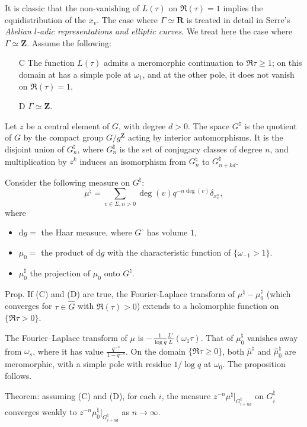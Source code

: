 \documentclass{article}
\newcommand{\bR}{\mathbf{R}}
\newcommand{\bZ}{\mathbf{Z}}
\newcommand{\dd}{\mathrm{d}}
\begin{document}
It is classic that the non-vanishing of $L(\tau)$ on $\Re(\tau)=1$ implies the 
equidistribution of the $x_v$. The case where $\Gamma\simeq \bR$ is treated in 
detail in Serre's \emph{Abelian $l$-adic representations and elliptic curves}. 
We treat here the case where $\Gamma\simeq \bZ$. Assume the following:
\begin{itemize}
\item[C] The function $L(\tau)$ admits a meromorphic continuation to 
$\Re\tau\geqslant 1$; on this domain at has a simple pole at $\omega_1$, and at 
the other pole, it does not vanish on $\Re(\tau)=1$.
\item[D] $\Gamma\simeq\bZ$. 
\end{itemize}

Let $z$ be a central element of $G$, with degree $d>0$. The space $G^\natural$ 
is the quotient of $G$ by the compact group $G/g^\bZ$ acting by interior 
automorphisms. It is the disjoint union of $G_n^\natural$, where $G_n^\natural$ 
is the set of conjugacy classes of degree $n$, and multiplication by $z^k$ 
induces an isomorphism from $G_n^\natural$ to $G_{n+k d}^\natural$. 

Consider the following measure on $G^\natural$:
\[
	\mu^\natural = \sum_{v\in\Sigma,n>0} \deg(v) q^{-n\deg(v)} \delta_{x_v^n} ,
\]
where 
\begin{itemize}
\item $\dd g=$ the Haar measure, where $G^\circ$ has volume $1$,
\item $\mu_0=$ the product of $\dd g$ with the characteristic function of 
$\{\omega_{-1}>1\}$. 
\item $\mu_0^\natural$ the projection of $\mu_0$ onto $G^\natural$.
\end{itemize}

Prop. If (C) and (D) are true, the Fourier-Laplace transform of 
$\mu^\natural-\mu_0^\natural$ (which converges for $\tau\in \widehat G$ with 
$\Re(\tau)>0$) extends to a holomorphic function on $\{\Re\tau>0\}$. 

The Fourier--Laplace transform of $\mu$ is 
$-\frac{1}{\log q} \frac{L'}{L}(\omega_1\tau)$. That of $\mu_0^\natural$ 
vanishes away from $\omega_s$, where it has value 
$\frac{q^{-s}}{1-q^{-s}}$. On the domain $\{\Re \tau\geqslant 0\}$, 
both $\widehat\mu^\natural$ and $\widehat \mu_0^\natural$ are meromorphic, 
with a simple pole with residue $1/\log q$ at $\omega_0$. The proposition follows. 

Theorem: assuming (C) and (D), for each $i$, the measure 
$z^{-n} \mu^\natural |_{G_{i+n d}^\natural}$ on $G_i^\natural$ converges 
weakly to $z^{-n}\mu_0^\natural|_{G_{i+n d}^\natural}$ as $n\to \infty$. 
\end{document}
